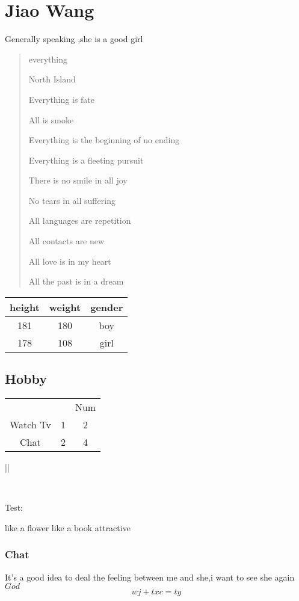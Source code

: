 \documentclass[11pt,a4paper,twoside]{article}
\begin{document}
\newpage
\section{Jiao Wang}
\raggedright Generally speaking ,she is a good girl
\begin{quotation}
everything

North Island

Everything is fate

All is smoke

Everything is the beginning of no ending

Everything is a fleeting pursuit

There is no smile in all joy

No tears in all suffering

All languages are repetition

All contacts are new

All love is in my heart

All the past is in a dream
\end{quotation}
\begin{tabular}{|c|c|c|}
  \hline
  height & weight& gender \\
  \hline
  181 & 180 & boy \\
  \hline
  178 & 108 & girl \\
  \hline
\end{tabular}
\subsection{Hobby}
\begin{tabular}{ccc}
  \hline
    &   & Num \\
  Watch Tv & 1 & 2 \\
  Chat & 2 & 4 \\
  \hline
\end{tabular}


|| \\
\par
\setlength{\fboxrule}{1.6pt}\
\setlength{\fboxsep}{3em}
\par
Test:\parbox[t]{10em}%
{like a flower   like a book attractive}
\subsubsection{Chat}
It's a good idea to deal the feeling between me and she,i want to see she again $God$
\begin{equation}
\label{Child}
  wj+txc=ty
\end{equation}
\end{document}
